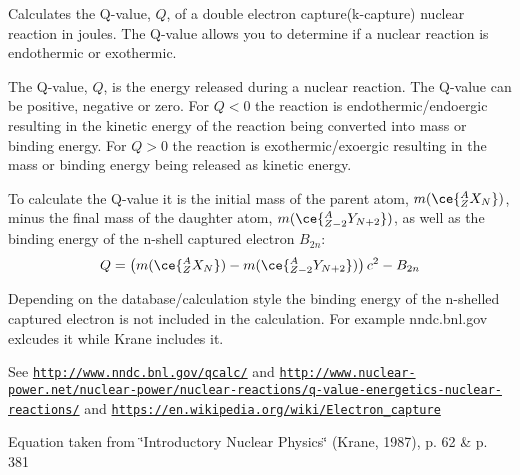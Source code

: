 Calculates the Q-\/value, $Q$, of a double electron capture(k-\/capture) nuclear reaction in joules. The Q-\/value allows you to determine if a nuclear reaction is endothermic or exothermic. 

The Q-\/value, $Q$, is the energy released during a nuclear reaction. The Q-\/value can be positive, negative or zero. For $Q < 0$ the reaction is endothermic/endoergic resulting in the kinetic energy of the reaction being converted into mass or binding energy. For $Q > 0$ the reaction is exothermic/exoergic resulting in the mass or binding energy being released as kinetic energy.

To calculate the Q-\/value it is the initial mass of the parent atom, $m(\ce{ ^{A}_{Z}X_{N} })$, minus the final mass of the daughter atom, $m(\ce{ ^{A}_{Z-2}Y_{N +2} })$, as well as the binding energy of the n-\/shell captured electron $B_{2n}$\+: \[Q = \left ( m(\ce{ ^{A}_{Z}X_{N} })-m(\ce{ ^{A}_{Z-2}Y_{N +2} }) \right) c^2-B_{2n}\]

Depending on the database/calculation style the binding energy of the n-\/shelled captured electron is not included in the calculation. For example nndc.\+bnl.\+gov exlcudes it while Krane includes it.

See \href{http://www.nndc.bnl.gov/qcalc/}{\tt http\+://www.\+nndc.\+bnl.\+gov/qcalc/} and \href{http://www.nuclear-power.net/nuclear-power/nuclear-reactions/q-value-energetics-nuclear-reactions/}{\tt http\+://www.\+nuclear-\/power.\+net/nuclear-\/power/nuclear-\/reactions/q-\/value-\/energetics-\/nuclear-\/reactions/} and \href{https://en.wikipedia.org/wiki/Electron_capture}{\tt https\+://en.\+wikipedia.\+org/wiki/\+Electron\+\_\+capture}

Equation taken from \char`\"{}\+Introductory Nuclear Physics\char`\"{} (Krane, 1987), p. 62 \& p. 381


